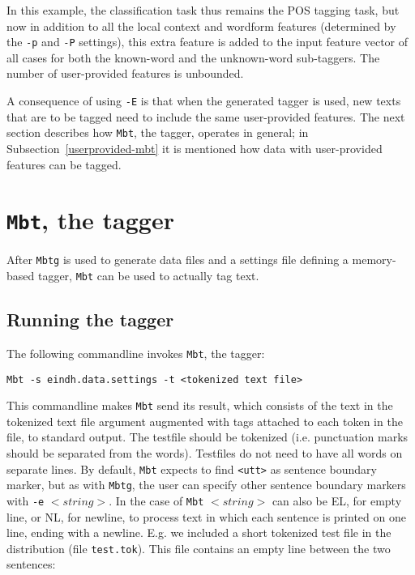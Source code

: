 \documentclass{report}
\begin{document}
In this example, the classification task thus remains the POS tagging
task, but now in addition to all the local context and wordform
features (determined by the {\tt -p} and {\tt -P} settings), this
extra feature is added to the input feature vector of all cases for
both the known-word and the unknown-word sub-taggers. The number of
user-provided features is unbounded.

A consequence of using {\tt -E} is that when the generated tagger is
used, new texts that are to be tagged need to include the same
user-provided features. The next section describes how {\tt Mbt}, the
tagger, operates in general; in Subsection~\ref{userprovided-mbt} it
is mentioned how data with user-provided features can be tagged.

\section{{\tt Mbt}, the tagger}

After {\tt Mbtg} is used to generate data files and a settings file
defining a memory-based tagger, {\tt Mbt} can be used to actually tag
text.

\subsection{Running the tagger}

The following commandline invokes {\tt Mbt}, the tagger:

{\small
\begin{verbatim}
Mbt -s eindh.data.settings -t <tokenized text file>
\end{verbatim}
}

This commandline makes {\tt Mbt} send its result, which consists of
the text in the tokenized text file argument augmented with tags
attached to each token in the file, to standard output. The testfile
should be tokenized (i.e. punctuation marks should be separated from
the words). Testfiles do not need to have all words on separate
lines. By default, {\tt Mbt} expects to find {\tt <utt>} as sentence
boundary marker, but as with {\tt Mbtg}, the user can specify other sentence
boundary markers with {\tt -e} $<string>$. In the case of {\tt Mbt}
$<string>$ can also be EL, for empty line, or NL, for newline, to
process text in which each sentence is printed on one line, ending
with a newline. E.g. we included a short tokenized test file in the
distribution (file {\tt test.tok}). This file contains an empty line
between the two sentences:
\end{document}
